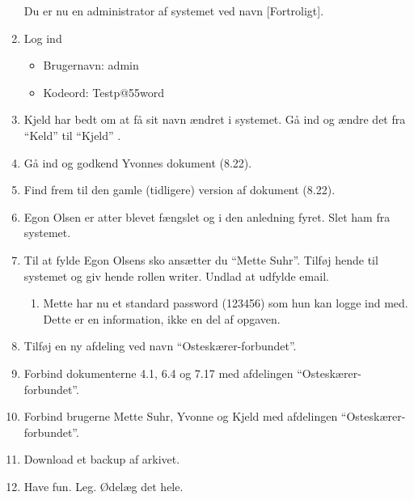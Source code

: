 \begin{enumerate}
Du er nu en administrator af systemet ved navn [Fortroligt].
	\item Log ind
		\begin{itemize}
			\item Brugernavn: admin
			\item Kodeord: Testp@55word
		\end{itemize}
	\item Kjeld har bedt om at få sit navn ændret i systemet. Gå ind og ændre det fra “Keld” til “Kjeld” .
	\item Gå ind og godkend Yvonnes dokument (8.22).
	\item Find frem til den gamle (tidligere) version af dokument (8.22).
	\item Egon Olsen er atter blevet fængslet og i den anledning fyret. Slet ham fra systemet.
	\item Til at fylde Egon Olsens sko ansætter du “Mette Suhr”. 	Tilføj hende til systemet og giv hende rollen writer.
Undlad at udfylde email.
		\begin{enumerate}
			\item Mette har nu et standard password (123456) som hun kan logge ind med. Dette er en information, ikke en del af opgaven.
		\end{enumerate}
	\item Tilføj en ny afdeling ved navn “Osteskærer-forbundet”.
	\item Forbind dokumenterne 4.1, 6.4 og 7.17 med afdelingen “Osteskærer-forbundet”.
	\item Forbind brugerne Mette Suhr, Yvonne og Kjeld med afdelingen “Osteskærer-forbundet”.
	\item Download et backup af arkivet.
	\item Have fun. Leg. Ødelæg det hele.
\end{enumerate}

